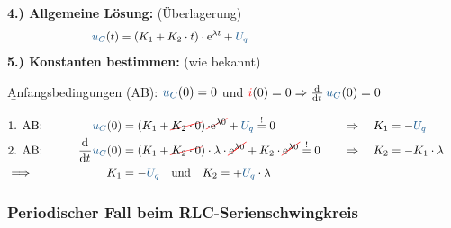 \begin{frame}\ftx{\subsubsecname}%
    \textbf{4.) Allgemeine Lösung:} (Überlagerung)%
    \begin{align}
        &&
            \ecv{u_C}(t) &= \left( K_1 + K_2 \cdot t \right) \cdot \mathrm{e}^{\lambda t} + \ecv{U_q} \nonumber\\[-14pt]
        &\hphantom{1Rooooooo}&\hphantom{2Loooooo}&\hphantom{2Roooooooooooooooooooooooooooooooooo}&\hphantom{3Loooooo}&\hphantom{3Roooooooooo} \nonumber %
    \end{align}
    \textbf{5.) Konstanten bestimmen:} (wie bekannt)

    \b{\vspace{4pt}Anfangsbedingungen (AB): $\ecv{u_C}(0)=0$ und $\eci{i}(0)=0 \Rightarrow \dt\, \ecv{u_C}(0) = 0 $}

    \begin{align*}
        &\hphantom{1Rooooooo}&\hphantom{2Loooooo}&\hphantom{2Roooooooooooooooooooooooooooooooooo}&\hphantom{3Loooooo}&\hphantom{3Roooooooooo}\\[-15pt] %
        &\text{1. AB:}&
            \ecv{u_C}(0) &= \left( K_1 + \redcancel{K_2 \cdot 0 }\right) \redcancel{\cdot \mathrm{e}^{\lambda 0}} + \ecv{U_q} \overset{!}{=} 0 & \Rightarrow\quad K_1 &= -\ecv{U_q}\\
        &\text{2. AB:}&
            \dt \ecv{u_C}(0) &= \left( K_1 + \redcancel{K_2 \cdot 0} \right) \cdot \lambda \cdot \redcancel{\mathrm{e}^{\lambda 0}} + K_2 \cdot \redcancel{\mathrm{e}^{\lambda 0}} \overset{!}{=} 0 & \Rightarrow\quad K_2 &= -K_1 \cdot \lambda \nonumber\\
            &\Longrightarrow&
        K_1 &= -\ecv{U_q} \quad\text{und}\quad
                K_2 = +\ecv{U_q} \cdot \lambda
    \end{align*}%
\end{frame}


\subsubsection[Periodischer Fall]{Periodischer Fall beim RLC-Serienschwingkreis}
\label{sec:schaltvorgaengezeitbereich:rlc:periodisch}


